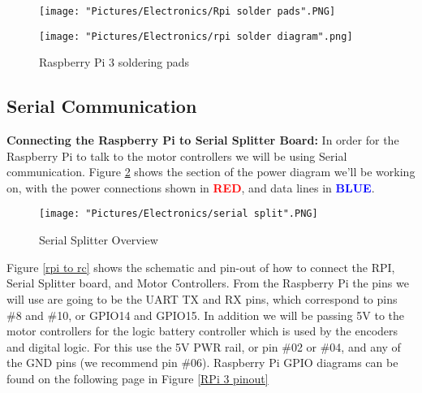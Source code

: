 \documentclass[12pt]{article}
\begin{document}
\begin{figure}[H]
 	\centering
  	\begin{minipage}[b]{0.40\textwidth}
		\texttt{[image: "Pictures/Electronics/Rpi solder pads".PNG]}
  	\end{minipage}
  	\hfill
  	\begin{minipage}[b]{0.50\textwidth}
    		\texttt{[image: "Pictures/Electronics/rpi solder diagram".png]}
  	\end{minipage}
	\caption{Raspberry Pi 3 soldering pads}
	\label{rpi pads}
\end{figure}



\subsection{Serial Communication}

\textbf{Connecting the Raspberry Pi to Serial Splitter Board:} In order for the Raspberry Pi to talk to the motor controllers we will be using Serial communication. Figure \ref{ss} shows the section of the power diagram we'll be working on, with the power connections shown in \textcolor{red}{\textbf{RED}}, and data lines in \textcolor{blue}{\textbf{BLUE}}. 

\begin{figure}[H]
  	\centering
    	\texttt{[image: "Pictures/Electronics/serial split".PNG]}
 	\caption{Serial Splitter Overview}
	\label{ss}
\end{figure}




Figure \ref{rpi to rc} shows the schematic and pin-out of how to connect the RPI, Serial Splitter board, and Motor Controllers. From the Raspberry Pi the pins we will use are going to be the UART TX and RX pins, which correspond to pins \#8 and \#10, or GPIO14 and GPIO15. In addition we will be passing 5V to the motor controllers for the logic battery controller which is used by the encoders and digital logic. For this use the 5V PWR rail, or pin  \#02 or \#04, and any of the GND pins (we recommend pin \#06). Raspberry Pi GPIO diagrams can be found on the following page in Figure \ref{RPi 3 pinout}
\end{document}
